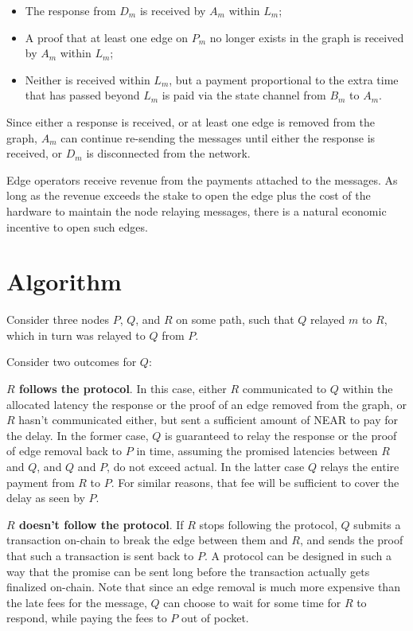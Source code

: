 \documentclass{article}
\begin{document}
\begin{itemize}
    \item The response from \( D_m \) is received by \( A_m \) within \( L_m \);
    \item A proof that at least one edge on \( P_m \) no longer exists in the graph is received by \( A_m \) within \( L_m \);
    \item Neither is received within \( L_m \), but a payment proportional to the extra time that has passed beyond \( L_m \) is paid via the state channel from \( B_m \) to \( A_m \).
\end{itemize}

Since either a response is received, or at least one edge is removed from the graph, \( A_m \) can continue re-sending the messages until either the response is received, or \( D_m \) is disconnected from the network.

Edge operators receive revenue from the payments attached to the messages. As long as the revenue exceeds the stake to open the edge plus the cost of the hardware to maintain the node relaying messages, there is a natural economic incentive to open such edges.

\section{Algorithm}

Consider three nodes \( P \), \( Q \), and \( R \) on some path, such that \( Q \) relayed \( m \) to \( R \), which in turn was relayed to \( Q \) from \( P \).

Consider two outcomes for \( Q \):

\textbf{\( R \) follows the protocol}. In this case, either \( R \) communicated to \( Q \) within the allocated latency the response or the proof of an edge removed from the graph, or \( R \) hasn't communicated either, but sent a sufficient amount of NEAR to pay for the delay. In the former case, \( Q \) is guaranteed to relay the response or the proof of edge removal back to \( P \) in time, assuming the promised latencies between \( R \) and \( Q \), and \( Q \) and \( P \), do not exceed actual. In the latter case \( Q \) relays the entire payment from \( R \) to \( P \). For similar reasons, that fee will be sufficient to cover the delay as seen by \( P \).

\textbf{\( R \) doesn't follow the protocol}. If \( R \) stops following the protocol, \( Q \) submits a transaction on-chain to break the edge between them and \( R \), and sends the proof that such a transaction is sent back to \( P \). A protocol can be designed in such a way that the promise can be sent long before the transaction actually gets finalized on-chain. Note that since an edge removal is much more expensive than the late fees for the message, \( Q \) can choose to wait for some time for \( R \) to respond, while paying the fees to \( P \) out of pocket.
\end{document}
